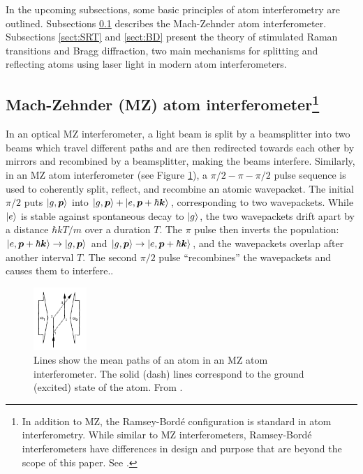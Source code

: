 \documentclass[reprint,
nofootinbib,
amsmath,amssymb,
aps]{revtex4-1}
\begin{document}
In the upcoming subsections, some basic principles of atom interferometry are outlined. Subsections \ref{sect:MZI} describes the Mach-Zehnder atom interferometer. Subsections \ref{sect:SRT} and \ref{sect:BD} present the theory of stimulated Raman transitions and Bragg diffraction, two main mechanisms for splitting and reflecting atoms using laser light in modern atom interferometers.  





\subsection{Mach-Zehnder (MZ) atom interferometer\footnote{In addition to MZ, the Ramsey-Bord\'{e} configuration is standard in atom interferometry. While similar to MZ interferometers, Ramsey-Bord\'{e} interferometers have differences in design and purpose that are beyond the scope of this paper. See \cite{mueller2014quantum}.}}\label{sect:MZI}

In an optical MZ interferometer,  a light beam is split by a beamsplitter into two beams which travel different paths and are then redirected towards each other by mirrors and recombined by a beamsplitter, making the beams interfere. Similarly, in an MZ atom interferometer (see Figure \ref{fig:MZI}), a $\pi/2-\pi-\pi/2$ pulse sequence is used to coherently split, reflect, and recombine an atomic wavepacket. The initial $\pi/2$ puts $\ket{g,\bm{p}}$ into $\ket{g,\bm{p}} + \ket{e,\bm{p} + \hbar \bm{k}}$, corresponding to two wavepackets. While $\ket{e}$ is stable against spontaneous decay to $\ket{g}$, the two wavepackets drift apart by a distance $\hbar kT /m$ over a duration $T$. The $\pi$ pulse then inverts the population: $\ket{e,\bm{p} + \hbar \bm{k}} \to \ket{g, \bm{p}}$ and $\ket{g,\bm{p}} \to \ket{e,\bm{p} + \hbar \bm{k}}$, and the wavepackets overlap after another interval $T$. The second $\pi/2$ pulse ``recombines'' the wavepackets and causes them to interfere.\cite{kasevich1992measurement}.


\begin{figure}
	\includegraphics[width=0.18\textwidth]{MZI.png}
	\caption{Lines show the mean paths of an atom in an MZ atom interferometer. The solid (dash) lines correspond to the ground (excited) state of the atom.  From \cite{kasevich1992measurement}.}
	\label{fig:MZI}
\end{figure}
\end{document}
